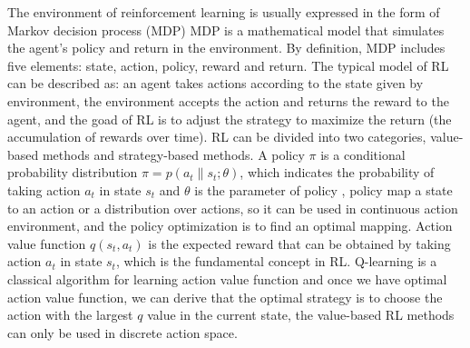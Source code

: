\documentclass[journal]{IEEEtran}
\begin{document}
The environment of reinforcement learning is usually expressed in the form of Markov decision process (MDP) \cite{van2012reinforcement}
MDP is a mathematical model that simulates the agent's policy and return in the environment.
By definition, MDP includes five elements: state, action, policy, reward and return.
The typical model of RL can be described as: an agent takes actions according to the state given by environment, the environment accepts the action and returns the reward to the agent, and the goad of RL is to adjust the strategy to maximize the return (the accumulation of rewards over time).
RL can be divided into two categories, value-based methods and strategy-based methods.
A policy $\pi$ is a conditional probability distribution $\pi = p(a_t\| s_t; \theta)$, which indicates the probability of taking action $a_t$ in state $s_t$ and $\theta$ is the parameter of policy \cite{sun2021learning}, policy map a state to an action or a distribution over actions, so it can be used in continuous action environment, and the policy optimization is to find an optimal mapping.
Action value function $q(s_t,a_t)$ is the expected reward that can be obtained by taking action $a_t$ in state $s_t$, which is the fundamental concept in RL. Q-learning \cite{watkins1992q} is a classical algorithm for learning action value function and once we have optimal action value function, we can derive that the optimal strategy is to choose the action with the largest $q$ value in the current state,
the value-based RL methods can only be used in discrete action space.
\end{document}
